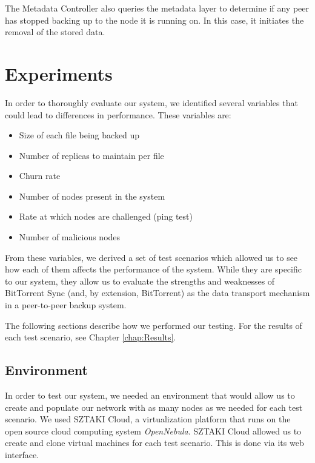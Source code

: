 \documentclass[12pt]{report}
\begin{document}

The Metadata Controller also queries the metadata layer to determine if any peer has stopped backing up to the node it is running on. In this case, it initiates the removal of the stored data.

\chapter{Experiments} \label{chap:Methodology}

In order to thoroughly evaluate our system, we identified several variables that could lead to differences in performance. These variables are:

\begin{itemize}
\item Size of each file being backed up
\item Number of replicas to maintain per file
\item Churn rate
\item Number of nodes present in the system
\item Rate at which nodes are challenged (ping test)
\item Number of malicious nodes
\end{itemize}

From these variables, we derived a set of test scenarios which allowed us to see how each of them affects the performance of the system. While they are specific to our system, they allow us to evaluate the strengths and weaknesses of BitTorrent Sync (and, by extension, BitTorrent) as the data transport mechanism in a peer-to-peer backup system.

The following sections describe how we performed our testing. For the results of each test scenario, see Chapter \ref{chap:Results}.

\section{Environment} \label{sec:Environment_chap:Methodology}


In order to test our system, we needed an environment that would allow us to create and populate our network with as many nodes as we needed for each test scenario. We used SZTAKI Cloud, a virtualization platform that runs on the open source cloud computing system \textit{OpenNebula}. SZTAKI Cloud allowed us to create and clone virtual machines for each test scenario. This is done via its web interface. %
\end{document}
